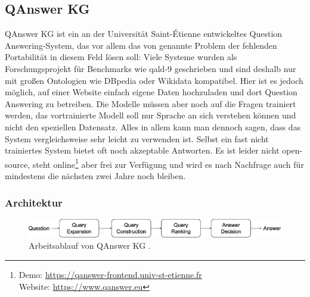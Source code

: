 \subsection{QAnswer KG}

QAnswer KG \citep{qanswer} ist ein an der Universität Saint-Étienne entwickeltes Question Answering-System,
das vor allem das von \citet{diefenbachkbqa} genannte Problem der fehlenden Portabilität in diesem Feld lösen soll:
Viele Systeme wurden als Forschungsprojekt für Benchmarks wie \ac{qald}-9 geschrieben und sind deshalb nur mit großen Ontologien wie DBpedia oder Wikidata kompatibel.
Hier ist es jedoch möglich, auf einer Website einfach eigene Daten hochzuladen und dort Question Answering zu betreiben.
Die Modelle müssen aber noch auf die Fragen trainiert werden, das vortrainierte Modell soll nur Sprache an sich verstehen können und nicht den speziellen Datensatz.
Alles in allem kann man dennoch sagen, dass das System vergleichsweise sehr leicht zu verwenden ist.
Selbst ein fast nicht trainiertes System bietet oft noch akzeptable Antworten.
Es ist leider nicht open-source, steht online\footnote{Demo: \url{https://qanswer-frontend.univ-st-etienne.fr}\\Website: \url{https://www.qanswer.eu}} aber frei zur Verfügung und wird es nach Nachfrage auch für mindestens die nächsten zwei Jahre noch bleiben.

\subsubsection{Architektur}

\begin{figure}%
\centering
\includegraphics[width=\textwidth, height=\textheight, keepaspectratio]{Images/QAnswerWorkflow.png}
\caption[QAnswer KG Arbeitsablauf]{Arbeitsablauf von QAnswer KG \citep{qanswer}.}
\label{fig:qanswerworkflow}
\end{figure}

